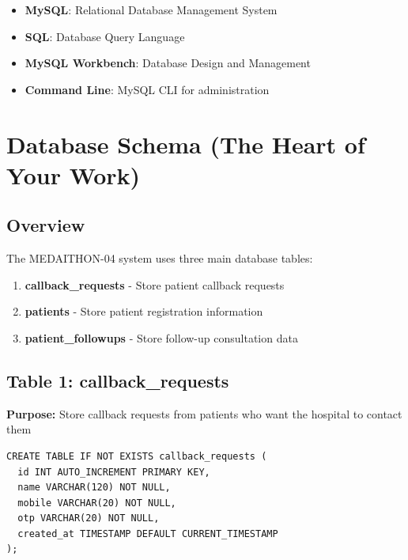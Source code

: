 \documentclass[12pt,a4paper]{article}
\begin{document}
\begin{tcolorbox}[colback=yellow!10,colframe=orange!50!black,title=Your Toolkit]
\begin{itemize}
    \item \textbf{MySQL}: Relational Database Management System
    \item \textbf{SQL}: Database Query Language
    \item \textbf{MySQL Workbench}: Database Design and Management
    \item \textbf{Command Line}: MySQL CLI for administration
\end{itemize}
\end{tcolorbox}

\section{Database Schema (The Heart of Your Work)}

\subsection{Overview}

The MEDAITHON-04 system uses three main database tables:

\begin{tcolorbox}[colback=cyan!10,colframe=cyan!50!black,title=Database Tables]
\begin{enumerate}
    \item \textbf{callback\_requests} - Store patient callback requests
    \item \textbf{patients} - Store patient registration information
    \item \textbf{patient\_followups} - Store follow-up consultation data
\end{enumerate}
\end{tcolorbox}

\subsection{Table 1: callback\_requests}

\textbf{Purpose:} Store callback requests from patients who want the hospital to contact them

\begin{lstlisting}[caption={callback\_requests Table Schema}]
CREATE TABLE IF NOT EXISTS callback_requests (
  id INT AUTO_INCREMENT PRIMARY KEY,
  name VARCHAR(120) NOT NULL,
  mobile VARCHAR(20) NOT NULL,
  otp VARCHAR(20) NOT NULL,
  created_at TIMESTAMP DEFAULT CURRENT_TIMESTAMP
);
\end{lstlisting}
\end{document}
